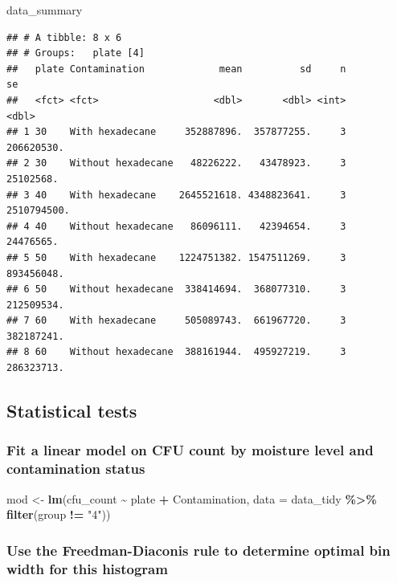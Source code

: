 \documentclass[
]{article}
\newenvironment{Shaded}{\begin{snugshade}}{\end{snugshade}}
\newcommand{\AttributeTok}[1]{\textcolor[rgb]{0.13,0.29,0.53}{#1}}
\newcommand{\FunctionTok}[1]{\textcolor[rgb]{0.13,0.29,0.53}{\textbf{#1}}}
\newcommand{\NormalTok}[1]{#1}
\newcommand{\OtherTok}[1]{\textcolor[rgb]{0.56,0.35,0.01}{#1}}
\newcommand{\SpecialCharTok}[1]{\textcolor[rgb]{0.81,0.36,0.00}{\textbf{#1}}}
\newcommand{\StringTok}[1]{\textcolor[rgb]{0.31,0.60,0.02}{#1}}
\begin{document}
\begin{Shaded}
\begin{Highlighting}[]
\NormalTok{data\_summary}
\end{Highlighting}
\end{Shaded}

\begin{verbatim}
## # A tibble: 8 x 6
## # Groups:   plate [4]
##   plate Contamination             mean          sd     n          se
##   <fct> <fct>                    <dbl>       <dbl> <int>       <dbl>
## 1 30    With hexadecane     352887896.  357877255.     3  206620530.
## 2 30    Without hexadecane   48226222.   43478923.     3   25102568.
## 3 40    With hexadecane    2645521618. 4348823641.     3 2510794500.
## 4 40    Without hexadecane   86096111.   42394654.     3   24476565.
## 5 50    With hexadecane    1224751382. 1547511269.     3  893456048.
## 6 50    Without hexadecane  338414694.  368077310.     3  212509534.
## 7 60    With hexadecane     505089743.  661967720.     3  382187241.
## 8 60    Without hexadecane  388161944.  495927219.     3  286323713.
\end{verbatim}

\subsection{Statistical tests}\label{statistical-tests}

\subsubsection{Fit a linear model on CFU count by moisture level and
contamination
status}\label{fit-a-linear-model-on-cfu-count-by-moisture-level-and-contamination-status}

\begin{Shaded}
\begin{Highlighting}[]
\NormalTok{mod }\OtherTok{\textless{}{-}} \FunctionTok{lm}\NormalTok{(cfu\_count }\SpecialCharTok{\textasciitilde{}}\NormalTok{ plate }\SpecialCharTok{+}\NormalTok{ Contamination, }\AttributeTok{data =}\NormalTok{ data\_tidy }\SpecialCharTok{\%\textgreater{}\%} \FunctionTok{filter}\NormalTok{(group }\SpecialCharTok{!=} \StringTok{"4"}\NormalTok{))}
\end{Highlighting}
\end{Shaded}

\subsubsection{Use the Freedman-Diaconis rule to determine optimal bin
width for this
histogram}\label{use-the-freedman-diaconis-rule-to-determine-optimal-bin-width-for-this-histogram}
\end{document}

